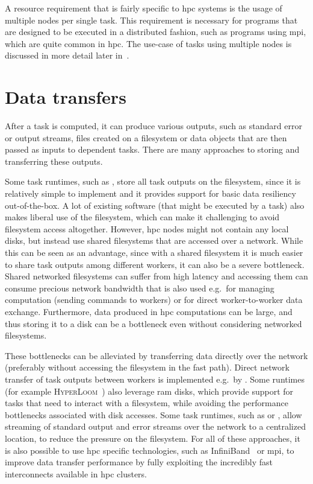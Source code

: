 A resource requirement that is fairly specific to \gls{hpc} systems is the usage
of multiple nodes per single task. This requirement is necessary for programs that are designed to
be executed in a distributed fashion, such as programs using \gls{mpi}, which are
quite common in \gls{hpc}. The use-case of tasks using multiple nodes is
discussed in more detail later in~.

\section{Data transfers}
After a task is computed, it can produce various outputs, such as standard error or output streams,
files created on a filesystem or data objects that are then passed as inputs to dependent tasks.
There are many approaches to storing and transferring these outputs.

Some task runtimes, such as \snakemake{}, store all task outputs on the filesystem, since it is
relatively simple to implement and it provides support for basic data resiliency out-of-the-box.
A lot of existing software (that might be executed by a task) also makes liberal use of the filesystem,
which can make it challenging to avoid filesystem access altogether. However, \gls{hpc}
nodes might not contain any local disks, but instead use shared filesystems that are accessed
over a network. While this can be seen as an advantage, since with a shared filesystem it is much
easier to share task outputs among different workers, it can also be a severe bottleneck. Shared
networked filesystems can suffer from high latency and accessing them can consume precious network
bandwidth that is also used e.g.\ for managing computation (sending commands to workers) or for
direct worker-to-worker data exchange. Furthermore, data produced in \gls{hpc}
computations can be large, and thus storing it to a disk can be a bottleneck even without
considering networked filesystems.

These bottlenecks can be alleviated by transferring data directly over the
network (preferably without accessing the filesystem in the fast path). Direct network transfer of
task outputs between workers is implemented e.g.\ by \dask{}. Some runtimes (for example
\textsc{HyperLoom}~\cite{hyperloom}) also leverage \gls{ram} disks, which provide support for tasks
that need to interact with a filesystem, while avoiding the performance bottlenecks associated with disk
accesses. Some task runtimes, such as \hypershell{} or \pegasus{}, allow streaming of standard
output and error streams over the network to a centralized location, to reduce the pressure on
the filesystem. For all of these approaches, it is also possible to use \gls{hpc} specific technologies, such as
InfiniBand~\cite{infiniband} or \gls{mpi}, to improve data transfer
performance by fully exploiting the incredibly fast interconnects available in
\gls{hpc} clusters.


